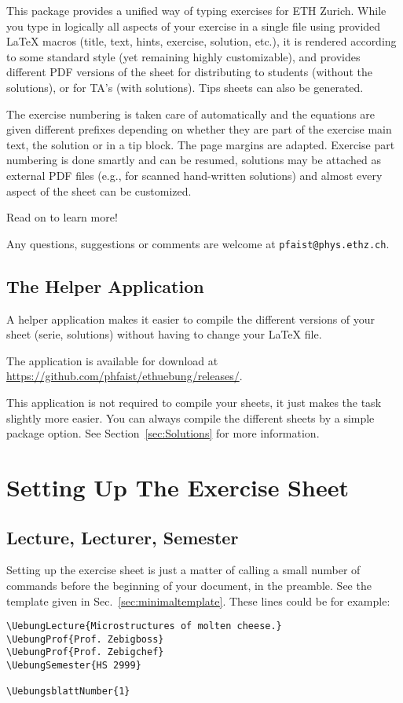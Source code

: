 \documentclass[11pt,a4paper]{article}
\begin{document}
This package provides a unified way of typing exercises for ETH Zurich. While you type in
logically all aspects of your exercise in a single file using provided \LaTeX{} macros
(title, text, hints, exercise, solution, etc.), it is rendered according to some standard
style (yet remaining highly customizable), and provides different PDF versions of the
sheet for distributing to students (without the solutions), or for TA's (with
solutions). Tips sheets can also be generated. 

The exercise numbering is taken care of automatically and the equations are given
different prefixes depending on whether they are part of the exercise main text, the
solution or in a tip block. The page margins are adapted. Exercise part numbering is done
smartly and can be resumed, solutions may be attached as external PDF files (e.g., for
scanned hand-written solutions) and almost every aspect of the sheet can be customized.

Read on to learn more!

Any questions, suggestions or comments are welcome at \texttt{pfaist{@}phys.ethz.ch}.


\subsection{The Helper Application}

A helper application makes it easier to compile the different versions of your sheet
(serie, solutions) without having to change your LaTeX file.

The application is available for download at
\url{https://github.com/phfaist/ethuebung/releases/}.

This application is not required to compile your sheets, it just makes the task slightly
more easier. You can always compile the different sheets by a simple package option. See
Section~\ref{sec:Solutions} for more information.

\section{Setting Up The Exercise Sheet}
\label{sec:SetupSheet}

\subsection{Lecture, Lecturer, Semester}

Setting up the exercise sheet is just a matter of calling a small number of commands
before the beginning of your document, in the preamble. See the template given in
Sec.~\ref{sec:minimaltemplate}. These lines could be for example:
\begin{pkgverbatim}
\begin{verbatim}
\UebungLecture{Microstructures of molten cheese.}
\UebungProf{Prof. Zebigboss}
\UebungProf{Prof. Zebigchef}
\UebungSemester{HS 2999}

\UebungsblattNumber{1}
\end{verbatim}
\end{pkgverbatim}
\end{document}
